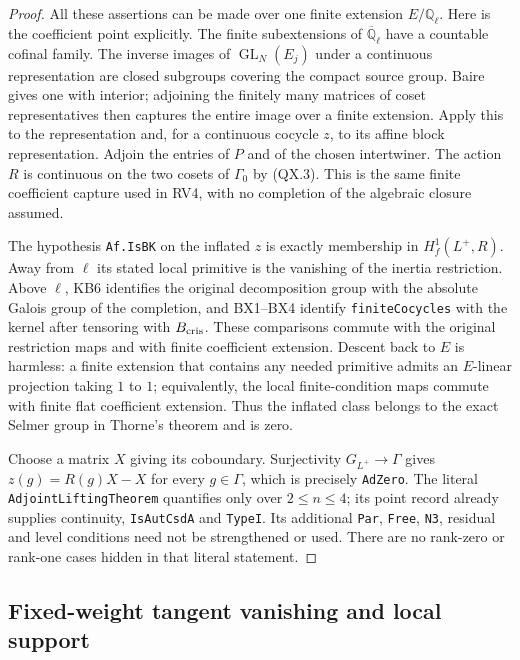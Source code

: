 \begin{proof}
All these assertions can be made over one finite extension
$E/\mathbb Q_\ell$.  Here is the coefficient point explicitly.
The finite subextensions of $\overline{\mathbb Q}_\ell$ have a
countable cofinal family.  The inverse images of
$\operatorname{GL}_N(E_j)$ under a continuous representation are
closed subgroups covering the compact source group.  Baire gives
one with interior; adjoining the finitely many matrices of coset
representatives then captures the entire image over a finite
extension.  Apply this to the representation and, for a continuous
cocycle $z$, to its affine block representation.  Adjoin the entries
of $P$ and of the chosen intertwiner.  The action $R$ is continuous
on the two cosets of $\Gamma_0$ by (QX.3).  This is the same finite
coefficient capture used in RV4, with no completion of the
algebraic closure assumed.

The hypothesis \texttt{Af.IsBK} on the inflated $z$ is exactly
membership in $H^1_f(L^+,R)$.  Away from $\ell$ its stated local
primitive is the vanishing of the inertia restriction.  Above
$\ell$, KB6 identifies the original decomposition group with the
absolute Galois group of the completion, and BX1--BX4 identify
\texttt{finiteCocycles} with the kernel after tensoring with
$B_{\rm cris}$.  These comparisons commute with the original
restriction maps and with finite coefficient extension.  Descent
back to $E$ is harmless: a finite extension that contains any
needed primitive admits an $E$-linear projection taking $1$ to $1$;
equivalently, the local finite-condition maps commute with finite
flat coefficient extension.  Thus the inflated class belongs to
the exact Selmer group in Thorne's theorem and is zero.

Choose a matrix $X$ giving its coboundary.  Surjectivity
$G_{L^+}\to\Gamma$ gives
$z(g)=R(g)X-X$ for every $g\in\Gamma$, which is precisely
\texttt{AdZero}.  The literal \texttt{AdjointLiftingTheorem}
quantifies only over $2\le n\le4$; its point record already supplies
continuity, \texttt{IsAutCsdA} and \texttt{TypeI}.  Its additional
\texttt{Par}, \texttt{Free}, \texttt{N3}, residual and level
conditions need not be strengthened or used.  There are no rank-zero
or rank-one cases hidden in that literal statement.
\end{proof}

\subsection{Fixed-weight tangent vanishing and local support}

